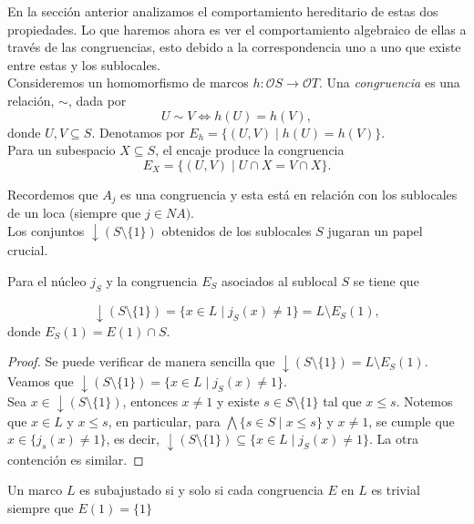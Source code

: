 \documentclass{comunicaciones}
\begin{document}
En la sección anterior analizamos el comportamiento hereditario de estas dos propiedades. Lo que haremos ahora es ver el comportamiento algebraico de ellas a través de las congruencias, esto debido a la correspondencia uno a uno que existe entre estas y los sublocales.\\

Consideremos un homomorfismo de marcos $h\colon \mathcal{O}S\to \mathcal{O}T$. Una \emph{congruencia} es una relación, $\sim$, dada por
\[
U\sim V\Leftrightarrow h(U)=h(V),
\]
donde $U, V\subseteq S$. Denotamos por $E_h=\{(U, V)\mid h(U)=h(V)\}$.\\

Para un subespacio $X\subseteq S$, el encaje produce la congruencia 
\[
E_X=\{(U, V)\mid U\cap X=V\cap X\}.
\]

Recordemos que $A_j$ es una congruencia y esta está en relación con los sublocales de un loca (siempre que $j\in NA)$.\\

Los conjuntos $\downarrow{(S\setminus \{1\})}$ obtenidos de los sublocales $S$ jugaran un papel crucial. 

\begin{prop}\label{Observacion6.1.1}
Para el núcleo $j_S$ y la congruencia $E_S$ asociados al sublocal $S$ se tiene que

\begin{equation}\label{Eq6.1.1}
    \downarrow{(S\setminus\{1\})}=\{x\in L\mid j_S(x)\neq 1\}=L\setminus E_S(1),
\end{equation}
donde $E_S(1)=E(1)\cap S$.
\end{prop}

\begin{proof}
    Se puede verificar de manera sencilla que $\downarrow(S\setminus \{1\})=L\setminus E_S(1)$. Veamos que $\downarrow(S\setminus\{1\})=\{x\in L\mid j_S(x)\neq 1\}$.\\

    Sea $x\in \downarrow(S\setminus \{1\})$, entonces $x\neq 1$ y existe $s\in S\setminus \{1\}$ tal que $x\leq s$. Notemos que $x\in L$ y $x\leq s$, en particular, para $\bigwedge \{s\in S\mid x\leq s\}$ y $x\neq1$, se cumple que $x\in \{j_s(x)\neq 1\}$, es decir, $\downarrow(S\setminus\{1\})\subseteq \{x\in L\mid j_S(x)\neq 1\}$. La otra contención es similar.
\end{proof}

\begin{thm}\label{Teorema6.2}
    Un marco $L$ es subajustado si y solo si cada congruencia $E$ en $L$ es trivial siempre que $E(1)=\{1\}$
\end{thm}
\end{document}
